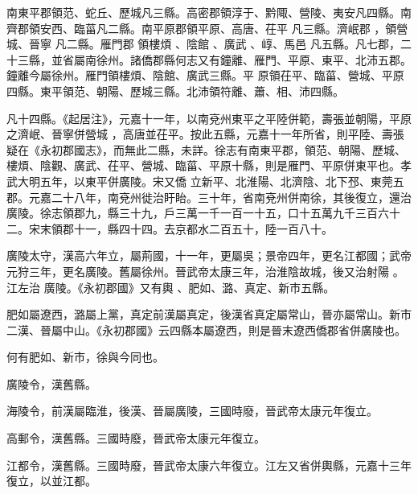 \begin{pinyinscope}
南東平郡領范、蛇丘、歷城凡三縣。高密郡領淳于、黔陬、營陵、夷安凡四縣。南齊郡領安西、臨菑凡二縣。南平原郡領平原、高唐、茌平
 凡三縣。濟岷郡
 ，領營城、晉寧
 凡二縣。雁門郡
 領樓煩
 、陰館
 、廣武
 、崞、馬邑
 凡五縣。凡七郡，二十三縣，並省屬南徐州。諸僑郡縣何志又有鐘離、雁門、平原、東平、北沛五郡。鐘離今屬徐州。雁門領樓煩、陰館、廣武三縣。平
 原領茌平、臨菑、營城、平原四縣。東平領范、朝陽、歷城三縣。北沛領符離、蕭、相、沛四縣。


凡十四縣。《起居注》，元嘉十一年，以南兗州東平之平陸併範，壽張並朝陽，平原之濟岷、晉寧併營城
 ，高唐並茌平。按此五縣，元嘉十一年所省，則平陸、壽張疑在《永初郡國志》，而無此二縣，未詳。徐志有南東平郡，領范、朝陽、歷城、樓煩、陰觀、廣武、茌平、營城、臨菑、平原十縣，則是雁門、平原併東平也。孝武大明五年，以東平併廣陵。宋又僑
 立新平、北淮陽、北濟陰、北下邳、東莞五郡。元嘉二十八年，南兗州徙治盱眙。三十年，省南兗州併南徐，其後復立，還治廣陵。徐志領郡九，縣三十九，戶三萬一千一百一十五，口十五萬九千三百六十二。宋末領郡十一，縣四十四。去京都水二百五十，陸一百八十。


廣陵太守，漢高六年立，屬荊國，十一年，更屬吳；景帝四年，更名江都國；武帝元狩三年，更名廣陵。舊屬徐州。晉武帝太康三年，治淮陰故城，後又治射陽
 。江左治
 廣陵。《永初郡國》又有輿
 、肥如、潞、真定、新市五縣。



 肥如屬遼西，潞屬上黨，真定前漢屬真定，後漢省真定屬常山，晉亦屬常山。新市二漢、晉屬中山。《永初郡國》云四縣本屬遼西，則是晉末遼西僑郡省併廣陵也。



 何有肥如、新市，徐與今同也。



 廣陵令，漢舊縣。



 海陵令，前漢屬臨淮，後漢、晉屬廣陵，三國時廢，晉武帝太康元年復立。



 高郵令，漢舊縣。三國時廢，晉武帝太康元年復立。



 江都令，漢舊縣。三國時廢，晉武帝太康六年復立。江左又省併輿縣，元嘉十三年復立，以並江都。




\end{pinyinscope}
